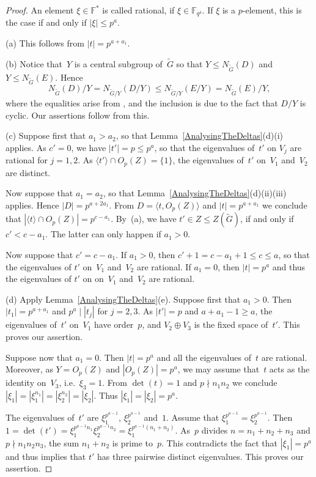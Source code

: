 \documentclass[12pt]{amsart}
\theoremstyle{theorem}
\theoremstyle{definition}
\theoremstyle{remark}
\begin{document}
\begin{proof}
An element $\xi \in \mathbb{F}^*$ is called rational, if 
$\xi \in \mathbb{F}_{q^{\delta}}$. If $\xi$ is a $p$-element, this is the case
if and only if $|\xi| \leq p^a$.

(a) This follows from $|t| = p^{a+a_1}$.

(b) Notice that~$Y$ is a central subgroup of~$\tilde{G}$ so that 
$Y \leq N_{\tilde{G}}( D )$ and $Y \leq N_{\tilde{G}}( E )$. Hence
$$N_{\tilde{G}}( D )/Y = N_{\tilde{G}/Y}( D/Y ) \leq 
N_{\tilde{G}/Y}( E/Y ) = N_{\tilde{G}}( E )/Y,$$
where the equalities arise from \cite[Lemma~$2.2$(a)]{HL24}, and the inclusion
is due to the fact that $D/Y$ is cyclic. Our assertions follow from this.

(c) Suppose first that $a_1 > a_2$, so that Lemma~\ref{AnalysingTheDeltas}(d)(i)
applies. As $c' = 0$, we have $|t'| = p \leq p^a$, so that the eigenvalues 
of~$t'$ on $V_j$ are rational for $j = 1, 2$. As 
$\langle t' \rangle \cap O_p( Z ) = \{ 1 \}$, the 
eigenvalues of~$t'$ on~$V_1$ and~$V_2$ are distinct. 

Now suppose that $a_1 = a_2$, so that 
Lemma~\ref{AnalysingTheDeltas}(d)(ii)(iii) applies. Hence $|D| = p^{a+2a_1}$. 
From $D = \langle t, O_p(Z) \rangle$ and $|t| = p^{a+a_1}$ we conclude that
$|\langle t \rangle \cap O_p(Z)| = p^{c-a_1}$. By~(a), we have
$t' \in Z \leq Z( \tilde{G} )$, if and only if $c' < c - a_1$. The latter can 
only happen if $a_1 > 0$.

Now suppose that $c' = c - a_1$. If $a_1 > 0$, then $c' + 1 = c - a_1 + 1
\leq c \leq a$, so that the eigenvalues of $t'$ on~$V_1$ and~$V_2$ are 
rational. If $a_1 = 0$, then $|t| = p^a$ and thus the
eigenvalues of $t'$ on on~$V_1$ and~$V_2$ are rational.

(d) Apply Lemma~\ref{AnalysingTheDeltas}(e). Suppose first that $a_1 > 0$. 
Then $|t_1| = p^{a+a_1}$ and $p^a \mid |t_j|$ for $j = 2, 3$. As 
$|t'| = p$ and $a + a_1 - 1 \geq a$, the eigenvalues of~$t'$ on~$V_1$ have 
order~$p$, and $V_2 \oplus V_3$ is the fixed space of~$t'$. This proves our 
assertion.

Suppose now that $a_1 = 0$. Then $|t| = p^a$ and all the eigenvalues of~$t$ are 
rational. Moreover, as $Y = O_p(Z)$ and $|O_p(Z)| = p^a$, we may assume that~$t$ 
acts as the identity on~$V_3$, i.e.\ $\xi_3 = 1$. From $\det(t) = 1$ and 
$p \nmid n_1n_2$ we conclude 
$|\xi_1| = |\xi_1^{n_1}| = |\xi_2^{n_2}| = |\xi_2|$. Thus
$|\xi_1| = |\xi_2| = p^a$.

The eigenvalues of~$t'$ are $\xi_1^{p^{a-1}}$, $\xi_2^{p^{a-1}}$ and~$1$.
Assume that $\xi_1^{p^{a-1}} = \xi_2^{p^{a-1}}$. Then $1 = \det(t') = 
\xi_1^{p^{a-1}n_1}\xi_2^{p^{a-1}n_2} = \xi_1^{p^{a-1}(n_1 + n_2)}$. As~$p$
divides $n = n_1 + n_2 + n_3$ and $p \nmid n_1n_2n_3$,
the sum $n_1+n_2$ is prime to~$p$. This contradicts the fact that 
$|\xi_1| = p^a$ and thus implies that $t'$ has three pairwise distinct 
eigenvalues. This proves our assertion.


\end{proof}
\end{document}
